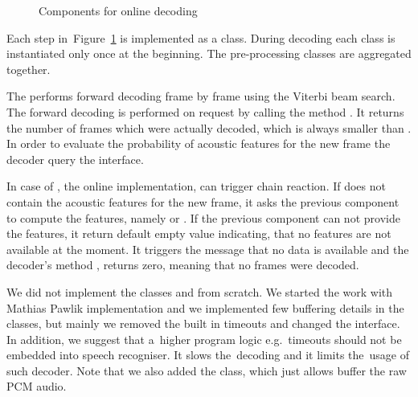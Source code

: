 \begin{figure}[!htp]
    \begin{center}
        
        \caption{Components for online decoding}
    \label{fig:online_pipeline} 
    \end{center}
\end{figure}

Each step in~Figure~\ref{fig:online_pipeline} is implemented as a class.
During decoding each class is instantiated only once at the beginning.
The pre-processing classes are aggregated together. 

The  performs forward decoding frame by frame using the Viterbi beam search.
The forward decoding is performed on request by calling the method .
It returns the number of frames which were actually decoded, which is always smaller than .
In order to evaluate the probability of acoustic features for the new frame
the decoder query the  interface.

In case of , the online implementation, can trigger chain reaction.
If  does not contain the acoustic features for the new frame, it asks
the previous component to compute the features, namely  or .
If the previous component can not provide the features, it return default empty value indicating,
that no features are not available at the moment. It triggers the message that no data is available
and the decoder's method , returns zero, meaning that no frames were decoded.


We did not implement the classes  and 
from scratch. We started the work with Mathias Pawlik implementation and we implemented few buffering details
in the classes, but mainly we removed the built in timeouts and changed the interface.
In addition, we suggest that a~higher program logic e.g.\ timeouts should not be embedded into speech recogniser.
It slows the~decoding and it limits the~usage of such decoder.
Note that we also added the  class, which just allows buffer the raw \ac{PCM} audio.






